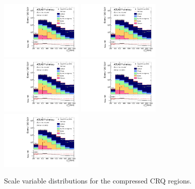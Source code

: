 \begin{figure}[tbph]
\begin{center}
\includegraphics[width=0.35\textwidth]{figures/ATLAS-CONF-2016-078_INT/N-1Plots/AtlasStyle/Preliminary/CRQ_SRJigsawSRC1_LastCut_CRQ_minusone}
\includegraphics[width=0.35\textwidth]{figures/ATLAS-CONF-2016-078_INT/N-1Plots/AtlasStyle/Preliminary/CRQ_SRJigsawSRC2_LastCut_CRQ_minusone}
\includegraphics[width=0.35\textwidth]{figures/ATLAS-CONF-2016-078_INT/N-1Plots/AtlasStyle/Preliminary/CRQ_SRJigsawSRC3_LastCut_CRQ_minusone}
\includegraphics[width=0.35\textwidth]{figures/ATLAS-CONF-2016-078_INT/N-1Plots/AtlasStyle/Preliminary/CRQ_SRJigsawSRC4_LastCut_CRQ_minusone}
\includegraphics[width=0.35\textwidth]{figures/ATLAS-CONF-2016-078_INT/N-1Plots/AtlasStyle/Preliminary/CRQ_SRJigsawSRC5_LastCut_CRQ_minusone}
\end{center}
\caption{Scale variable distributions for the compressed CRQ regions.}
\label{fig:CRQ_SRJigsawSRC1_LastCut_CRQ_minusone}
\end{figure}

